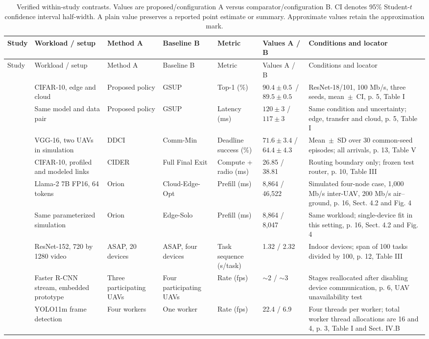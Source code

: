 \documentclass[pdflatex,sn-vancouver-num]{sn-jnl}
\begin{document}
\begin{longtable}{@{}Y{.064\linewidth}Y{.158\linewidth}Y{.103\linewidth}Y{.103\linewidth}Y{.094\linewidth}Y{.122\linewidth}Y{.269\linewidth}@{}}
\caption{Verified within-study contrasts. Values are proposed/configuration A versus comparator/configuration B. CI denotes 95\% Student-$t$ confidence interval half-width. A plain value preserves a reported point estimate or summary. Approximate values retain the approximation mark.}\label{tab:outcomes}\\
\toprule
Study & Workload / setup & Method A & Baseline B & Metric & Values A / B & Conditions and locator \\
\midrule
\endfirsthead
\toprule
Study & Workload / setup & Method A & Baseline B & Metric & Values A / B & Conditions and locator \\
\midrule
\endhead
\bottomrule
\endlastfoot
\cite{R0080} & CIFAR-10, edge and cloud & Proposed policy & GSUP & Top-1 (\%) & \mbox{$90.4\pm0.5$ /}\newline\mbox{$89.5\pm0.5$} & ResNet-18/101, 100 Mb/s, three seeds, \mbox{mean $\pm$ CI}, p. 5, Table I \\
\cite{R0080} & Same model and data pair & Proposed policy & GSUP & Latency (ms) & $120\pm3$ / $117\pm3$ & Same condition and uncertainty; edge, transfer and cloud, p. 5, Table I \\
\cite{R0092} & VGG-16, two UAVs in simulation & DDCI & Comm-Min & Deadline success (\%) & $71.6\pm3.4$ / $64.4\pm4.3$ & \mbox{Mean $\pm$ SD} over 30 common-seed episodes; all arrivals, p. 13, Table V \\
\cite{R0075} & CIFAR-10, profiled and modeled links & CIDER & Full Final Exit & Compute + radio (ms) & 26.85 / 38.81 & Routing boundary only; frozen test router, p. 10, Table III \\
\cite{R0074} & Llama-2 7B FP16, 64 tokens & Orion & Cloud-Edge-Opt & Prefill (ms) & 8,864 / 46,522 & Simulated four-node case, 1,000 Mb/s inter-UAV, 200 Mb/s air--ground, p. 16, Sect. 4.2 and Fig. 4 \\
\cite{R0074} & Same parameterized simulation & Orion & Edge-Solo & Prefill (ms) & 8,864 / 8,047 & Same workload; single-device fit in this setting, p. 16, Sect. 4.2 and Fig. 4 \\
\cite{R0014} & ResNet-152, 720 by 1280 video & ASAP, 20 devices & ASAP, four devices & Task sequence (s/task) & 1.32 / 2.32 & Indoor devices; span of 100 tasks divided by 100, p. 12, Table III \\
\cite{R0062} & Faster R-CNN stream, embedded prototype & Three participating UAVs & Four participating UAVs & Rate (fps) & $\sim$2 / $\sim$3 & Stages reallocated after disabling device communication, p. 6, UAV unavailability test \\
\cite{R0125} & YOLO11m frame detection & Four workers & One worker & Rate (fps) & 22.4 / 6.9 & Four threads per worker; total worker thread allocations are 16 and 4, p. 3, Table I and Sect. IV.B \\
\end{longtable}\endgroup
\end{document}

